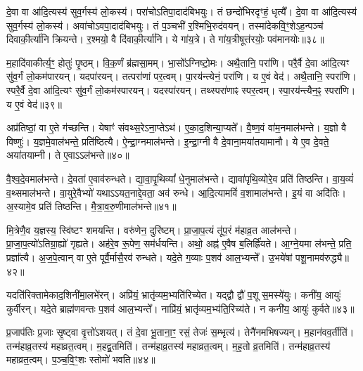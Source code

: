 दे॒वा वा आ॑दि॒त्यस्य॑ सुव॒र्गस्य॑ लो॒कस्य॑।
परा॑चो\-ऽतिपा॒दा\-द॑बिभयुः।
तं छन्दो॑भिरदृꣳहं॒ धृत्यै᳚।
दे॒वा वा आ॑दि॒त्यस्य॑ सुव॒र्गस्य॑ लो॒कस्य॑।
अवा॑चो\-ऽवपा॒दाद॑बिभयुः।
तं प॒ञ्चभी॑ र॒श्मिभि॒रुद॑वयन्।
तस्मा॑देकवि॒ꣳ॒शे\-ऽह॒न्पञ्च॑ दिवाकी॒र्त्या॑नि क्रियन्ते।
र॒श्मयो॒ वै दि॑वाकी॒र्त्या॑नि।
ये गा॑य॒त्रे।
ते गा॑य॒त्रीषूत्त॑रयोः॒ पव॑मानयोः॥३८॥\ip

म॒हादि॑वाकीर्त्य॒ꣳ॒ होतुः॑ पृ॒ष्ठम्।
वि॒क॒र्णं ब्र॑ह्मसा॒मम्।
भा॒सो᳚\-ऽग्निष्टो॒मः।
अथै॒तानि॒ परा॑णि।
परै॒र्वै दे॒वा आ॑दि॒त्यꣳ सु॑व॒र्गं लो॒कम॑पारयन्।
यदपा॑रयन्।
तत्परा॑णां पर॒त्वम्।
पा॒रय॑न्त्येनं॒ परा॑णि।
य ए॒वं वेद॑।
अथै॒तानि॒ स्परा॑णि।
स्परै॒र्वै दे॒वा आ॑दि॒त्यꣳ सु॑व॒र्गं लो॒कम॑स्पारयन्।
यदस्पा॑रयन्।
तथ्स्परा॑णाꣴ स्पर॒त्वम्।
स्पा॒रय॑न्त्यैन॒ꣴ॒ स्परा॑णि।
य ए॒वं वेद॑॥३९॥\ip\anuvakamend[ए॒ति॒ पव॑मानयोः॒ स्परा॑णि॒ पञ्च॑ च]

अप्र॑तिष्ठां॒ वा ए॒ते ग॑च्छन्ति।
येषाꣳ॑ संवथ्स॒रे\-ऽना॒प्तेऽथ॑।
ए॒का॒द॒शिन्या॒प्यते᳚।
वै॒ष्ण॒वं वा॑म॒नमाल॑भन्ते।
य॒ज्ञो वै विष्णुः॑।
य॒ज्ञमे॒वाल॑भन्ते॒ प्रति॑\-ष्ठित्यै।
ऐ॒न्द्रा॒ग्नमाल॑भन्ते।
इ॒न्द्रा॒ग्नी वै दे॒वाना॒मया॑तयामानौ।
ये ए॒व दे॒वते॒ अया॑तयाम्नी।
ते ए॒वाऽऽल॑भन्ते॥४०॥\ip

वै॒श्व॒दे॒वमाल॑भन्ते।
दे॒वता॑ ए॒वाव॑रुन्धते।
द्या॒वा॒पृ॒थिव्यां᳚ धे॒नुमाल॑भन्ते।
द्यावा॑पृथि॒व्योरे॒व प्रति॑ तिष्ठन्ति।
वा॒य॒व्यं॑ व॒थ्समाल॑भन्ते।
वा॒युरे॒वैभ्यो॑ यथा\-ऽऽयत॒नाद्दे॒वता॒ अव॑ रुन्धे।
आ॒दि॒त्यामविं॑ व॒शामाल॑भन्ते।
इ॒यं वा अदि॑तिः।
अ॒स्यामे॒व प्रति॑ तिष्ठन्ति।
मै॒त्रा॒व॒रु॒णीमाल॑भन्ते॥४१॥\ip

मि॒त्रेणै॒व य॒ज्ञस्य॒ स्वि॑ष्टꣳ शमयन्ति।
वरु॑णेन॒ दुरि॑ष्टम्।
प्रा॒जा॒प॒त्यं तू॑प॒रं म॑हाव्र॒त आल॑भन्ते।
प्रा॒जा॒प॒त्यो॑\-ऽतिग्रा॒ह्यो॑ गृह्यते।
अह॑रे॒व रू॒पेण॒ सम॑र्धयन्ति।
अथो॒ अह्न॑ ए॒वैष ब॒लिर्\mbox{}ह्रि॑यते।
आ॒ग्ने॒यमा ल॑भन्ते॒ प्रति॒ प्रज्ञा᳚त्यै।
अ॒ज॒पे॒त्वान् वा ए॒ते पूर्वै॒र्मासै॒रव॑ रुन्धते।
यदे॒ते ग॒व्याः प॒शव॑ आल॒भ्यन्ते᳚।
उ॒भये॑षां पशू॒नामव॑रुद्ध्यै॥४२॥\ip

यदति॑रिक्तामेकाद॒शिनी॑मा॒लभे॑रन्।
अप्रि॑यं॒ भ्रातृ॑व्यम॒भ्यति॑\-रिच्येत।
यद्द्वौ द्वौ॑ प॒शू स॒मस्ये॑युः।
कनी॑य॒ आयुः॑ कुर्वीरन्।
यदे॒ते ब्राह्म॑णवन्तः प॒शव॑ आल॒भ्यन्ते᳚।
नाप्रि॑यं॒ भ्रातृ॑व्यम॒भ्य॑ति॒\-रिच्य॑ते।
न कनी॑य॒ आयुः॑ कुर्वते॥४३॥\ip\anuvakamend[ते ए॒वाल॑भन्ते मैत्रावरु॒णीमाल॑भ॒न्ते\-ऽव॑रुद्ध्यै स॒प्त च॑]

प्र॒जा\-प॑तिः प्र॒जाः सृ॒ष्ट्वा वृ॒त्तो॑\-ऽशयत्।
तं दे॒वा भू॒ताना॒ꣳ॒ रसं॒ तेजः॑ स॒म्भृत्य॑।
तेनै॑नमभिषज्यन्।
म॒हान॑वव॒र्तीति॑।
तन्म॑हाव्र॒तस्य॑ महाव्रत॒त्वम्।
म॒हद्व्र॒तमिति॑।
तन्म॑हाव्र॒तस्य॑ महाव्रत॒त्वम्।
म॒ह॒तो व्र॒तमिति॑।
तन्म॑हाव्र॒तस्य॑ महाव्रत॒त्वम्।
प॒ञ्च॒वि॒ꣳ॒शः स्तोमो॑ भवति॥४४॥\ip

